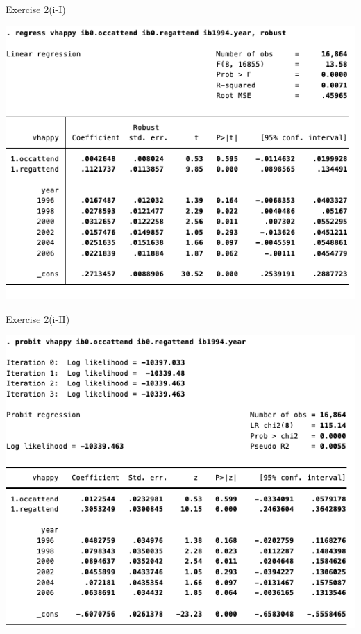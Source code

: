 \documentclass[
  10pt,
  ignorenonframetext,
]{beamer}
\begin{document}
\begin{frame}{Exercise 2(i-I)}
\protect\hypertarget{ex2-LPM}{}
\begin{center}\includegraphics[width=0.9\linewidth]{pictures/ex2-LPM} \end{center}
\end{frame}

\begin{frame}{Exercise 2(i-II)}
\protect\hypertarget{ex2-PROBIT.png}{}
\begin{center}\includegraphics[width=0.8\linewidth]{pictures/ex2-PROBIT} \end{center}
\end{frame}
\end{document}

